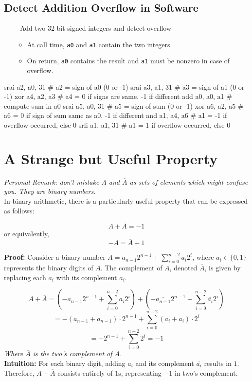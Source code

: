 \subsection{Detect Addition Overflow in Software}
\begin{itemize}
    \item[-] Add two 32-bit signed integers and detect overflow
    \begin{itemize}
        \item At call time, \texttt{a0} and \texttt{a1} contain the two integers.
        \item On return, \texttt{a0} contains the result and \texttt{a1} must be nonzero in case of overflow.
    \end{itemize}
\end{itemize}

\begin{assembly}
srai a2, a0, 31       # a2 = sign of a0 (0 or -1)
srai a3, a1, 31       # a3 = sign of a1 (0 or -1)
xor  a4, a2, a3       # a4 = 0 if signs are same, -1 if different
add  a0, a0, a1       # compute sum in a0
srai a5, a0, 31       # a5 = sign of sum (0 or -1)
xor  a6, a2, a5       # a6 = 0 if sign of sum same as a0, -1 if different
and  a1, a4, a6       # a1 = -1 if overflow occurred, else 0
srli a1, a1, 31       # a1 = 1 if overflow occurred, else 0
\end{assembly}

\section{A Strange but Useful Property}
\textit{Personal Remark: don't mistake A and $\overline{A}$ as sets of elements which might confuse you. They are binary numbers.} \\
In binary arithmetic, there is a particularly useful property that can be expressed as follows:

\[
A + \overline{A} = -1
\]
or equivalently,
\[
-A = \overline{A} + 1
\]

\textbf{Proof:} Consider a binary number $A = a_{n-1}2^{n-1} + \sum_{i=0}^{n-2} a_i 2^i$, where $a_i \in \{0,1\}$ represents the binary digits of $A$. The complement of $A$, denoted $\overline{A}$, is given by replacing each $a_i$ with its complement $\overline{a_i}$.

\[
A + \overline{A} = \left( -a_{n-1}2^{n-1} + \sum_{i=0}^{n-2} a_i 2^i \right) + \left( -\overline{a_{n-1}} 2^{n-1} + \sum_{i=0}^{n-2} \overline{a_i} 2^i \right)
\]
\[
= -(a_{n-1} + \overline{a_{n-1}}) \cdot 2^{n-1} + \sum_{i=0}^{n-2} (a_i + \overline{a_i}) \cdot 2^i
\]
\[
= -2^{n-1} + \sum_{i=0}^{n-2} 2^i = -1
\]
\textit{Where $\overline{A}$ is the two's complement of $A$.} \\
\textbf{Intuition:} For each binary digit, adding $a_i$ and its complement $\overline{a_i}$ results in $1$. Therefore, $A + \overline{A}$ consists entirely of $1$s, representing $-1$ in two's complement.

